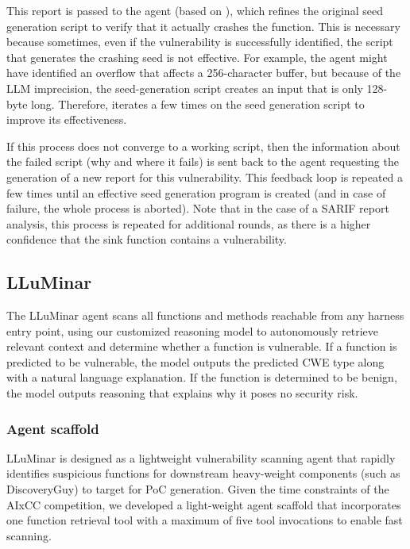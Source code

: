 This report is passed to the \seedgeneration agent (based on \ofourmini), which refines the original seed generation script to verify that it actually crashes the function.
This is necessary because sometimes, even if the vulnerability is successfully identified, the script that generates the crashing seed is not effective.
For example, the \jimmypwn agent might have identified an overflow that affects a 256-character buffer, but because of the LLM imprecision, the seed-generation script creates an input that is only 128-byte long.
Therefore, \seedgeneration iterates a few times on the seed generation script to improve its effectiveness.

If this process does not converge to a working script, then the information about the failed script (why and where it fails) is sent back to the \jimmypwn agent requesting the generation of a new report for this vulnerability.
This feedback loop is repeated a few times until an effective seed generation program is created (and in case of failure, the whole process is aborted).
Note that in the case of a SARIF report analysis, this process is repeated for additional rounds, as there is a higher confidence that the sink function contains a vulnerability.

\subsection{LLuMinar}
\label{lluminar}
The LLuMinar agent scans all functions and methods reachable from any harness entry point, using our customized reasoning model to autonomously retrieve relevant context and determine whether a function is vulnerable. If a function is predicted to be vulnerable, the model outputs the predicted CWE type along with a natural language explanation. If the function is determined to be benign, the model outputs reasoning that explains why it poses no security risk.

\subsubsection{Agent scaffold}
\label{sec:lluminar_agent}

LLuMinar is designed as a lightweight vulnerability scanning agent that rapidly identifies suspicious functions for downstream heavy-weight components (such as DiscoveryGuy) to target for PoC generation.
Given the time constraints of the AIxCC competition, we developed a light-weight agent scaffold that incorporates one function retrieval tool with a maximum of five tool invocations to enable fast scanning.

